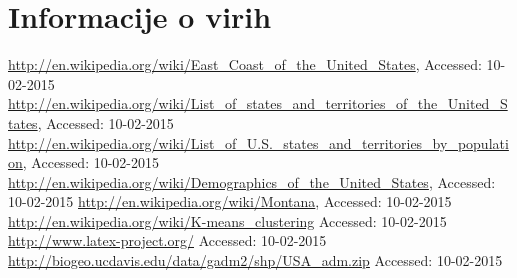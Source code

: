 \documentclass[11pt,a4paper]{article}
\begin{document}
\section{Informacije o virih}
\begin{thebibliography}{9}

  \url{http://en.wikipedia.org/wiki/East_Coast_of_the_United_States},
  {Accessed: 10-02-2015}
  \url{http://en.wikipedia.org/wiki/List_of_states_and_territories_of_the_United_States},
  {Accessed: 10-02-2015}
  \url{http://en.wikipedia.org/wiki/List_of_U.S._states_and_territories_by_population},
  {Accessed: 10-02-2015}
  \url{http://en.wikipedia.org/wiki/Demographics_of_the_United_States},
  {Accessed: 10-02-2015}
  \url{http://en.wikipedia.org/wiki/Montana},
  {Accessed: 10-02-2015}
  \url{http://en.wikipedia.org/wiki/K-means_clustering}
  {Accessed: 10-02-2015}
  \url{http://www.latex-project.org/}
  {Accessed: 10-02-2015}
  \url{http://biogeo.ucdavis.edu/data/gadm2/shp/USA_adm.zip}
  {Accessed: 10-02-2015}
  
\end{thebibliography}
\end{document}
